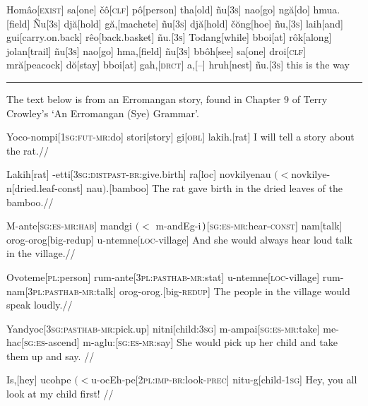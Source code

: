 
\let\\=\textsc

\noindent
\begingl
Hom\^{a}o[\\{exist}] sa[one]
\v{c}\^{o}[\\{clf}]
p\^{o}[person]
tha[old]
\~{n}u[\\{3s}]
nao[go]
ng\u{a}[do]
hmua.[field]
\~{N}u[\\{3s}]
dj\u{a}[hold]
g\u{a},[machete]
\~{n}u[\\{3s}]
dj\u{a}[hold]
\v{c}\u{o}ng[hoe]
\~{n}u,[\\{3s}]
laih[and]
gui[carry.on.back]
r\^{e}o[back.basket]
\~{n}u.[\\{3s}]
Todang[while]
bboi[at]
r\^{o}k[along]
jolan[trail]
\~{n}u[\\{3s}]
nao[go]
hma,[field]
\~{n}u[\\{3s}]
bb\^{o}h[see]
sa[one]
droi[\\{clf}]
mr\u{a}[peacock]
d\u{o}[stay]
bboi[at]
gah,[\\{drct}]
a,[--]
hruh[nest]
\~{n}u.[\\{3s}]
\endilg
this is the way
\endgl

\bigskip
\hrule
\bigskip

The text below is from an Erromangan story, found in Chapter 9 of Terry
Crowley's `An Erromangan (Sye) Grammar'.

\bigskip
\exdisplay
\begingl
Yoco-nompi[\textsc{1sg:fut-mr:}do]
stori[story]
gi[\textsc{obl}]
lakih.[rat]
\endilg
\glft I will tell a story about the rat.//
\endgl
 \xe

\exdisplay
\begingl
Lakih[rat]
-etti[\textsc{3sg:distpast-br:}give.birth]
ra[\sc loc]
{novkilyenau $(<$novkilye-n}[dried.leaf-\sc const]
nau$)$.[bamboo]
\endilg
\glft The rat gave birth in the dried leaves of the bamboo.//
\endgl
\xe

\exdisplay\begingl
M-ante[\textsc{sg:es-mr:hab}]
{mandgi $(<$ m-andEg-i$\mskip2mu)$}[\textsc{sg:es-mr:}hear-\textsc{const}]
nam[talk]
orog-orog[big-\sc redup]
u-ntemne[\textsc{loc}-village]
\endilg
\glft And she would always hear loud talk in the village.//
\endgl
\xe

\exdisplay
\begingl
Ovoteme[\textsc{pl}:person]
rum-ante[\textsc{3pl:pasthab-mr:}stat]
u-ntemne[\textsc{loc}-village]
rum-nam[\textsc{3pl:pasthab-mr:}talk]
orog-orog.[big-\textsc{redup}]
\endilg
\glft The people in the village would speak loudly.//
\endgl
\xe

\exdisplay
\begingl
Yandyoc[\textsc{3sg:pasthab-mr:}pick.up]
nitni[child:\textsc{3sg}]
m-ampai[\textsc{sg:es-mr:}take]
me-hac[\textsc{sg:es-}ascend]
m-aglu:[\textsc{sg:es-mr:}say]
\endilg
\glft She would pick up her child and take them up and say. //
\endgl
\xe

\exdisplay
\begingl
Is,[hey]
{ucohpe $(<$u-ocEh-pe}[\textsc{2pl:imp-br:}look\textsc{-prec}]
nitu-g[child\textsc{-1sg}]
\endilg
\glft Hey, you all look at my child first! //
\endgl
\xe


